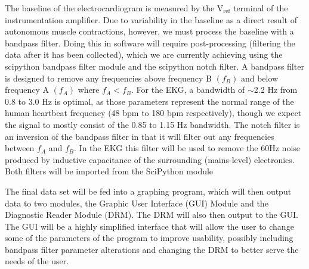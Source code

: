 \documentclass[11pt, oneside]{article}   	%
\begin{document}
\par 
The baseline of the electrocardiogram is measured by the $\text{V}_{\text{ref}}$ terminal of the instrumentation amplifier. Due to variability in the baseline as a direct result of autonomous muscle contractions, however, we must process the baseline with a bandpass filter. Doing this in software will require post-processing (filtering the data after it has been collected), which we are currently achieving using the scipython bandpass filter module and the scipython notch filter. A bandpass filter is designed to remove any frequencies above frequency B $(f_B)$ and below frequency A $(f_A)$ where $f_A < f_B$. For the EKG, a bandwidth of $\sim$2.2 Hz from 0.8 to 3.0 Hz is optimal, as those parameters represent the normal range of the human heartbeat frequency (48 bpm to 180 bpm respectively), though we expect the signal to mostly consist of the 0.85 to 1.15 Hz bandwidth. The notch filter is an inversion of the bandpass filter in that it will filter out any frequencies between $f_A$ and $f_B$. In the EKG this filter will be used to remove the 60Hz noise produced by inductive capacitance of the surrounding (mains-level) electronics. Both filters will be imported from the SciPython module \cite{SciPython}    

The final data set will be fed into a graphing program, which will then output data to two modules, the Graphic User Interface (GUI) Module and the Diagnostic Reader Module (DRM). The DRM will also then output to the GUI. The GUI will be a highly simplified interface that will allow the user to change some of the parameters of the program to improve usability, possibly including bandpass filter parameter alterations and changing the DRM to better serve the needs of the user. 
\end{document}
